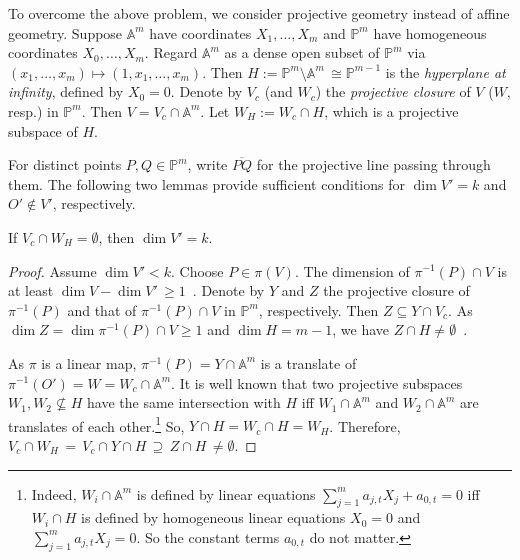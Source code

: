 \documentclass{toc}
\newcommand{\aff}{\mathbb{A}}
\newcommand{\proj}{\mathbb{P}}
\begin{document}
  To overcome the above problem, we consider projective geometry instead of affine geometry.
  Suppose $\aff^m$ have coordinates $X_1,\dots,X_m$ and $\proj^m$ have homogeneous coordinates $X_0,\ldots,X_m$.
  Regard $\aff^m$ as a dense open subset of $\proj^m$ via $(x_1,\dots,x_m)\mapsto (1,x_1,\dots,x_m)$. Then $H:= \proj^m\setminus \aff^m \,\cong \proj^{m-1}$ is the \emph{hyperplane at infinity}, defined by $X_0=0$.
Denote by $V_c$
%
(and $W_c$)   %
the \emph{projective closure} of $V$
%
($W$, resp.)   %
in $\proj^m$. Then $V = V_c\cap \aff^m$.
  Let $W_H:= W_c\cap H$, which is a projective subspace of $H$. 
  
  For distinct points $P,Q\in\proj^m$, write $\overline{PQ}$ for the projective line passing through them.  The following two lemmas  provide sufficient conditions for $\dim V'=k$ and $O'\not\in V'$, respectively.
%
%
\begin{lemma}\label{lem_projcriterion}  
 If $V_c\cap W_H=\emptyset$, then  $\dim V'=k$.
\end{lemma}

\begin{proof}
Assume $\dim V'<k$. Choose $P\in\pi(V)$. The dimension of $\pi^{-1}(P)\cap V$ is at least $\dim V-\dim V' \,\geq 1$~\cite[Theorem~11.12]{Har92}.
Denote by $Y$ and $Z$  the projective closure of $\pi^{-1}(P)$ and that of $\pi^{-1}(P)\cap V$ in $\proj^m$, respectively.
%
Then $Z\subseteq Y\cap V_c$. As $\dim Z=\dim \pi^{-1}(P)\cap V\geq 1$ and $\dim H=m-1$, we have $Z\cap H\neq\emptyset$~\cite[Proposition~11.4]{Har92}. 

As $\pi$ is a linear map, $\pi^{-1}(P)=Y\cap\aff^m$ is a translate of $\pi^{-1}(O')= W =W_c\cap\aff^m$. It is well known that two projective subspaces $W_1,W_2\not\subseteq H$ have the same intersection with $H$ iff $W_1\cap \aff^m$ and $W_2\cap \aff^m$ are translates of each other.\footnote{Indeed, $W_i\cap \aff^m$ is defined by linear equations $\sum_{j=1}^m a_{j,t} X_j +a_{0,t}=0$ iff $W_i\cap H$ is defined by homogeneous linear equations $X_0=0$ and $\sum_{j=1}^m a_{j,t} X_j=0$. So the constant terms $a_{0,t}$ do not matter.}
So, $Y\cap H=W_c\cap H=W_H$. Therefore,
$V_c\cap W_H \,=\, V_c\cap Y\cap H \,\supseteq\, Z\cap H \,\neq \emptyset$.
\end{proof}
\end{document}
